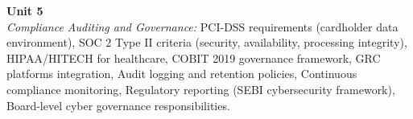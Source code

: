 \vspace{0.3cm}

\noindent\textbf{Unit 5} \\
\textit{Compliance Auditing and Governance:} PCI-DSS requirements (cardholder data environment), SOC 2 Type II criteria (security, availability, processing integrity), HIPAA/HITECH for healthcare, COBIT 2019 governance framework, GRC platforms integration, Audit logging and retention policies, Continuous compliance monitoring, Regulatory reporting (SEBI cybersecurity framework), Board-level cyber governance responsibilities.

\newpage
{}
